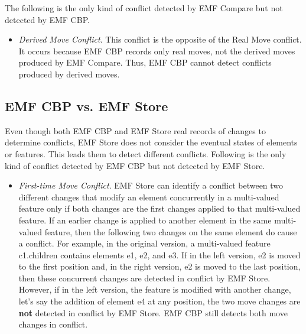 The following is the only kind of conflict detected by EMF Compare but not detected by EMF CBP.
\begin{itemize}
  \item \emph{Derived Move Conflict}. This conflict is the opposite of the Real Move conflict. It occurs because EMF CBP records only real moves, not the derived moves produced by EMF Compare. Thus, EMF CBP cannot detect conflicts produced by derived moves.
\end{itemize}

\subsection{EMF CBP vs. EMF Store}
\label{sec:emf_cbp_vs_emf_store}
Even though both EMF CBP and EMF Store real records of changes to determine conflicts, EMF Store does not consider the eventual states of elements or features. This leads them to detect different conflicts. Following is the only kind of conflict detected by EMF CBP but not detected by EMF Store.
\begin{itemize}
  \item \emph{First-time Move Conflict}. EMF Store can identify a conflict between two different changes that modify an element concurrently in a multi-valued feature only if both changes are the first changes applied to that multi-valued feature. If an earlier change is applied to another element in the same multi-valued feature, then the following two changes on the same element do cause a conflict. For example, in the original version, a multi-valued feature \textsf{c1}.\textsf{children} contains elements \textsf{e1}, \textsf{e2}, and \textsf{e3}. If in the left version, \textsf{e2} is moved to the first position and, in the right version, \textsf{e2} is moved to the last position, then these concurrent changes are detected in conflict by EMF Store. However, if in the left version, the feature is modified with another change, let’s say the addition of element \textsf{e4} at any position, the two \textsf{move} changes are \textbf{not} detected in conflict by EMF Store. EMF CBP still detects both \textsf{move} changes in conflict.
\end{itemize}

